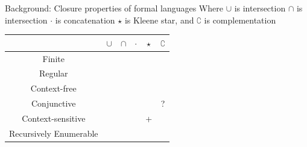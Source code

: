 \documentclass{beamer}
\newcommand{\cmark}{\ding{51}}%
\newcommand{\xmark}{\ding{55}}%
\begin{document}
    \begin{frame}[fragile]{Background: Closure properties of formal languages}
        Where $\cup$ is intersection  $\cap$ is intersection  $\cdot$ is concatenation  $\star$ is Kleene star,  and $\complement$ is complementation\\
        \begin{table}
            \begin{tabular}{c|ccccc}
                & $\cup$ & $\cap$ & $\cdot$ & $\star$ & $\complement$ \\
                \hline
                Finite & \cmark & \cmark & \cmark & \cmark & \cmark \\
                Regular & \cmark & \cmark & \cmark & \cmark & \cmark \\
                Context-free & \cmark & \xmark & \cmark & \cmark & \xmark \\
                Conjunctive & \cmark & \cmark & \cmark & \cmark & ? \\
                Context-sensitive & \cmark & \cmark & \cmark & + & \cmark \\
                Recursively Enumerable & \cmark & \cmark & \cmark & \cmark & \xmark \\
            \end{tabular}
        \end{table}
    \end{frame}
\end{document}

